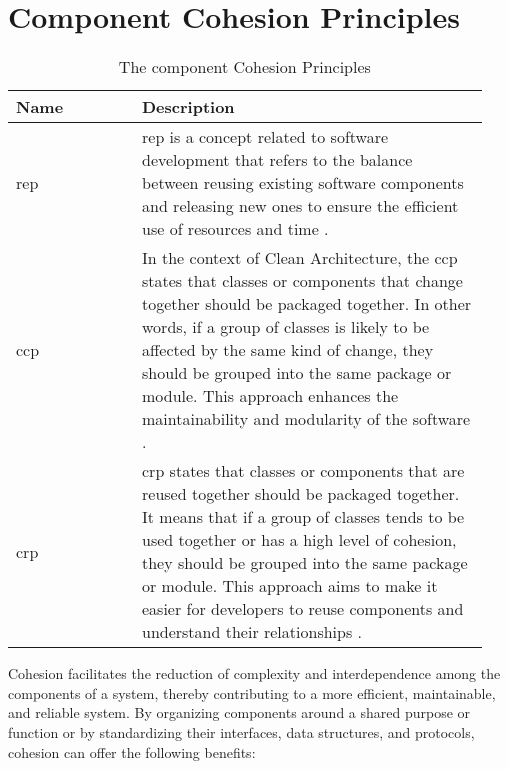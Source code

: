 \chapter{Component Cohesion Principles} \label{appendix_cohesion_principles}

\begin{table}[H]
    \small
    \begin{tabular}{ P{0.25\linewidth} | p{0.69\linewidth}} 
        \hline
        \textbf{Name} & \textbf{Description} \\ \hline
        \acrlong{rep} & \acrshort{rep} is a concept related to software development that
        refers to the balance between reusing existing software components and releasing
        new ones to ensure the efficient use of resources and time
        \parencite[104]{robert_c_martin_clean_2018}.\\ \midrule 
        
        \acrlong{ccp} & In the context of Clean Architecture, the \acrshort{ccp} states
        that classes or components that change together should be packaged together. In
        other words, if a group of classes is likely to be affected by the same kind of
        change, they should be grouped into the same package or module. This approach
        enhances the maintainability and modularity of the software
        \parencite[105]{robert_c_martin_clean_2018}.\\ \midrule 
        
        \acrlong{crp} & \acrshort{crp} states that classes or components that are reused
        together should be packaged together. It means that if a group of classes tends to
        be used together or has a high level of cohesion, they should be grouped into the
        same package or module. This approach aims to make it easier for developers to
        reuse components and understand their relationships
        \parencite[107]{robert_c_martin_clean_2018}.\\

        \bottomrule
    \end{tabular}
    \caption{The component Cohesion Principles}
    \label{appendix_tab_cohesion_principles}
\end{table}

Cohesion facilitates the reduction of complexity and interdependence among the components
of a system, thereby contributing to a more efficient, maintainable, and reliable system.
By organizing components around a shared purpose or function or by standardizing their
interfaces, data structures, and protocols, cohesion can offer the following benefits:

